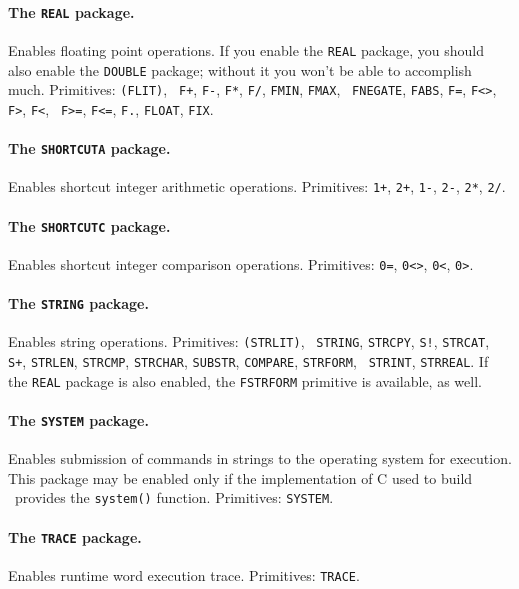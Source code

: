 \documentclass[twocolumn]{article}
\begin{document}
\paragraph{The {\tt REAL} package.}
Enables floating point operations.  If you enable the {\tt REAL}
package, you should also enable the {\tt DOUBLE} package; without it
you won't be able to accomplish much.  Primitives: {\tt (FLIT)}, {\tt
F+}, {\tt F-}, {\tt F*}, {\tt F/}, {\tt FMIN}, {\tt FMAX}, {\tt
FNEGATE}, {\tt FABS}, {\tt F=}, {\tt F<>}, {\tt F>}, {\tt F<}, {\tt
F>=}, {\tt F<=}, {\tt F.}, {\tt FLOAT}, {\tt FIX}.

\paragraph{The {\tt SHORTCUTA} package.}
Enables shortcut integer arithmetic operations.  Primitives: {\tt 1+},
{\tt 2+}, {\tt 1-}, {\tt 2-}, {\tt 2*}, {\tt 2/}.

\paragraph{The {\tt SHORTCUTC} package.}
Enables shortcut integer comparison operations.  Primitives: {\tt 0=},
{\tt 0<>}, {\tt 0<}, {\tt 0>}.

\paragraph{The {\tt STRING} package.}
Enables string operations.  Primitives: {\tt (STRLIT)}, {\tt
STRING}, {\tt STRCPY}, {\tt S!}, {\tt STRCAT}, {\tt S+}, {\tt STRLEN}, 
{\tt STRCMP}, {\tt STRCHAR}, {\tt SUBSTR}, {\tt COMPARE}, {\tt STRFORM}, {\tt
STRINT}, {\tt STRREAL}\@.  If the {\tt REAL} package is also enabled,
the {\tt FSTRFORM} primitive is available, as well.

\paragraph{The {\tt SYSTEM} package.}
Enables submission of commands in strings to the operating system for
execution.  This package may be enabled only if the implementation of
C used to build \atlast\ provides the {\tt system()} function.
Primitives: {\tt SYSTEM}.

\paragraph{The {\tt TRACE} package.}
Enables runtime word execution trace.  Primitives: {\tt TRACE}.
\end{document}
